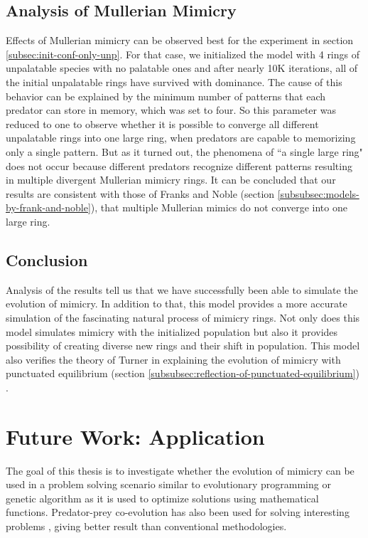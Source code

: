 \documentclass[letterpaper]{article}
\numberwithin{equation}{section}
\begin{document}
\subsection{Analysis of Mullerian Mimicry}
\label{subsec:result-mullerian-mimicry}
Effects of Mullerian mimicry can be observed best for the experiment in section \ref{subsec:init-conf-only-unp}. For that case, we initialized the model with 4 rings of unpalatable species with no palatable ones and after nearly 10K iterations, all of the initial unpalatable rings have survived with dominance. The cause of this behavior can be explained by the minimum number of patterns that each predator can store in memory, which was set to four. So this parameter was reduced to one to observe whether it is possible to converge all different unpalatable rings into one large ring, when predators are capable to memorizing only a single pattern. But as it turned out, the phenomena of ``a single large ring" does not occur because different predators recognize different patterns resulting in multiple divergent Mullerian mimicry rings. It can be concluded that our results are consistent with those of Franks and Noble (section \ref{subsubsec:models-by-frank-and-noble}), that multiple Mullerian mimics do not converge into one large ring.

\subsection{Conclusion}
\label{subsec:result-conclusion}
Analysis of the results tell us that we have successfully been able to simulate the evolution of mimicry. In addition to that, this model provides a more accurate simulation of the fascinating natural process of mimicry rings. Not only does this model simulates mimicry with the initialized population but also it provides possibility of creating diverse new rings and their shift in population. This model also verifies the theory of Turner in explaining the evolution of mimicry with punctuated equilibrium (section \ref{subsubsec:reflection-of-punctuated-equilibrium}) \cite{turner1988}.

\section{Future Work: Application}
\label{section:application}

The goal of this thesis is to investigate whether the evolution of mimicry can be used in a problem solving scenario similar to evolutionary programming or genetic algorithm as it is used to optimize solutions using mathematical functions. Predator-prey co-evolution has also been used for solving interesting problems \cite{hillis1990}, giving better result than conventional methodologies. 
\end{document}
